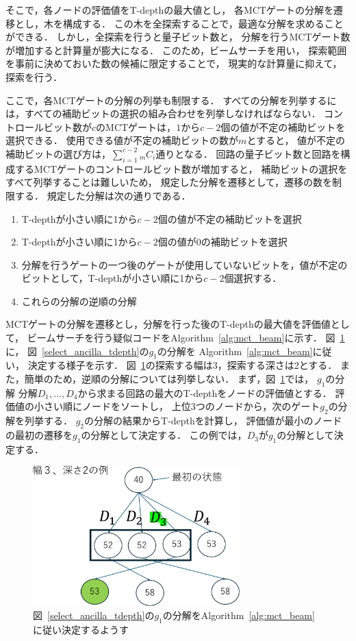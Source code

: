 そこで，各ノードの評価値をT-depthの最大値とし，
各MCTゲートの分解を遷移とし，木を構成する．
この木を全探索することで，最適な分解を求めることができる．
しかし，全探索を行うと量子ビット数と，
分解を行うMCTゲート数が増加すると計算量が膨大になる．
このため，ビームサーチ\cite{bisiani1992beam}を用い，
探索範囲を事前に決めておいた数の候補に限定することで，
現実的な計算量に抑えて，探索を行う．
\par
ここで，各MCTゲートの分解の列挙も制限する．
すべての分解を列挙するには，すべての補助ビットの選択の組み合わせを列挙しなければならない．
コントロールビット数が$c$のMCTゲートは，$1$から$c-2$個の値が不定の補助ビットを選択できる．
使用できる値が不定の補助ビットの数が$m$とすると，
値が不定の補助ビットの選び方は，$\sum_{i = 1}^{c-2} {}_mC_{i}$通りとなる．
回路の量子ビット数と回路を構成するMCTゲートのコントロールビット数が増加すると，
補助ビットの選択をすべて列挙することは難しいため，
規定した分解を遷移として，遷移の数を制限する．
規定した分解は次の通りである．
\begin{enumerate}[(1)]
  \item T-depthが小さい順に1から$c-2$個の値が不定の補助ビットを選択
  \item T-depthが小さい順に1から$c-2$個の値が0の補助ビットを選択
  \item 分解を行うゲートの一つ後のゲートが使用していないビットを，値が不定のビットとして，T-depthが小さい順に1から$c-2$個選択する．
  \item これらの分解の逆順の分解
\end{enumerate}
\par
MCTゲートの分解を遷移とし，分解を行った後のT-depthの最大値を評価値として，
ビームサーチを行う疑似コードをAlgorithm~\ref{alg:mct_beam}に示す．
図~\ref{mct_beam}に，
図~\ref{select_ancilla_tdepth}の$g_{1}$の分解を
Algorithm~\ref{alg:mct_beam}に従い，
決定する様子を示す．
図~\ref{mct_beam}の探索する幅は3，探索する深さは2とする．
また，簡単のため，逆順の分解については列挙しない．
まず，図~\ref{mct_beam}では，
$g_{1}$の分解
分解$D_{1},\dots,D_{4}$から求まる回路の最大のT-depthをノードの評価値とする．
評価値の小さい順にノードをソートし，
上位3つのノードから，次のゲート$g_{2}$の分解を列挙する．
$g_{2}$の分解の結果からT-depthを計算し，
評価値が最小のノードの最初の遷移を$g_{1}$の分解として決定する．
この例では，$D_{3}$が$g_{1}$の分解として決定する．
\begin{figure}[tbp]
  \centering
  \includegraphics[width=8cm]{img/mct_beam.pdf}
  \caption{図~\ref{select_ancilla_tdepth}の$g_{1}$の分解をAlgorithm~\ref{alg:mct_beam}に従い決定するようす}
  \label{mct_beam}
\end{figure}
